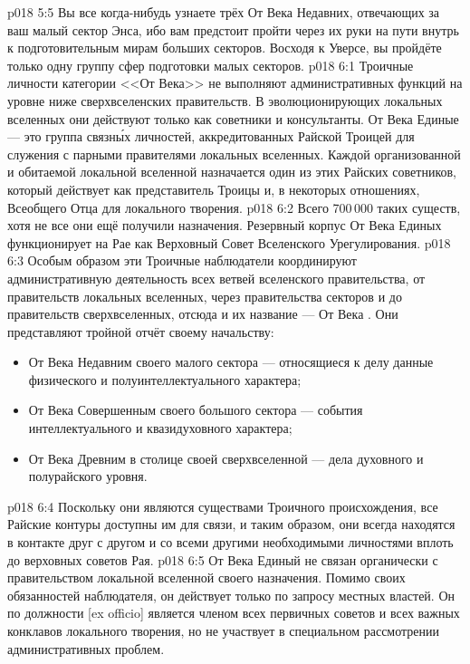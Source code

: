 \vs p018 5:5 Вы все когда\hyp{}нибудь узнаете трёх От Века Недавних, отвечающих за ваш малый сектор Энса, ибо вам предстоит пройти через их руки на пути внутрь к подготовительным мирам больших секторов. Восходя к Уверсе, вы пройдёте только одну группу сфер подготовки малых секторов.
\vs p018 6:1 Троичные личности категории <<От Века>> не выполняют административных функций на уровне ниже сверхвселенских правительств. В эволюционирующих локальных вселенных они действуют только как советники и консультанты. От Века Единые --- это группа связн\'ых личностей, аккредитованных Райской Троицей для служения с парными правителями локальных вселенных. Каждой организованной и обитаемой локальной вселенной назначается один из этих Райских советников, который действует как представитель Троицы и, в некоторых отношениях, Всеобщего Отца для локального творения.
\vs p018 6:2 Всего 700\,000 таких существ, хотя не все они ещё получили назначения. Резервный корпус От Века Единых функционирует на Рае как Верховный Совет Вселенского Урегулирования.
\vs p018 6:3 Особым образом эти Троичные наблюдатели координируют административную деятельность всех ветвей вселенского правительства, от правительств локальных вселенных, через правительства секторов и до правительств сверхвселенных, отсюда и их название --- От Века . Они представляют тройной отчёт своему начальству: \begin{itemize}\item От Века Недавним своего малого сектора --- относящиеся к делу данные физического и полуинтеллектуального характера;\item От Века Совершенным своего большого сектора --- события интеллектуального и квазидуховного характера;\item От Века Древним в столице своей сверхвселенной --- дела духовного и полурайского уровня.\end{itemize}
\vs p018 6:4 Поскольку они являются существами Троичного происхождения, все Райские контуры доступны им для связи, и таким образом, они всегда находятся в контакте друг с другом и со всеми другими необходимыми личностями вплоть до верховных советов Рая.
\vs p018 6:5 \pc От Века Единый не связан органически с правительством локальной вселенной своего назначения. Помимо своих обязанностей наблюдателя, он действует только по запросу местных властей. Он по должности [ex officio] является членом всех первичных советов и всех важных конклавов локального творения, но не участвует в специальном рассмотрении административных проблем.
